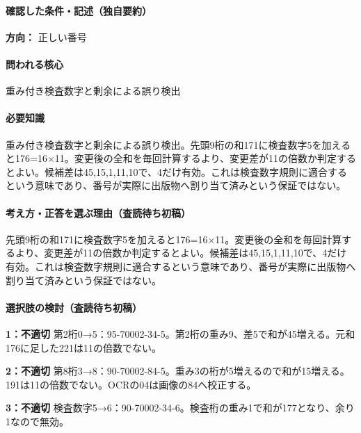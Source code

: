 \paragraph{確認した条件・記述（独自要約）}\mbox{}\par

\noindent\textbf{方向：} 正しい番号\par

\paragraph{問われる核心} 重み付き検査数字と剰余による誤り検出

\paragraph{必要知識} 重み付き検査数字と剰余による誤り検出。先頭9桁の和171に検査数字5を加えると176=\allowbreak{}16×11。変更後の全和を毎回計算するより、変更差が11の倍数か判定するとよい。候補差は45,15,1,11,10で、4だけ有効。これは検査数字規則に適合するという意味であり、番号が実際に出版物へ割り当て済みという保証ではない。

\paragraph{考え方・正答を選ぶ理由（査読待ち初稿）} 先頭9桁の和171に検査数字5を加えると176=\allowbreak{}16×11。変更後の全和を毎回計算するより、変更差が11の倍数か判定するとよい。候補差は45,15,1,11,10で、4だけ有効。これは検査数字規則に適合するという意味であり、番号が実際に出版物へ割り当て済みという保証ではない。

\paragraph{選択肢の検討（査読待ち初稿）}\mbox{}\par

\noindent\textbf{1：不適切} 第2桁0→5：95-70002-34-5。第2桁の重み9、差5で和が45増える。元和176に足した221は11の倍数でない。\par

\noindent\textbf{2：不適切} 第8桁3→8：90-70002-84-5。重み3の桁が5増えるので和が15増える。191は11の倍数でない。OCRの04は画像の84へ校正する。\par

\noindent\textbf{3：不適切} 検査数字5→6：90-70002-34-6。検査桁の重み1で和が177となり、余り1なので無効。\par

